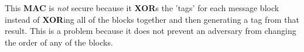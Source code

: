 \documentclass[../midterm.tex]{subfiles}
\begin{document}
\begin{flushleft}




  This \textbf{MAC} is \emph{not} secure because it \textbf{XOR}s the 'tags' for each message block instead of \textbf{XOR}ing all of the blocks together and then generating a tag from that result.  This is a problem because it does not prevent an adversary from changing the order of any of the blocks.



\end{flushleft}
\end{document}
